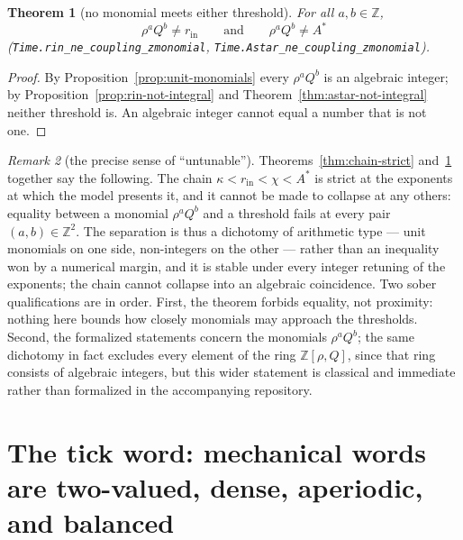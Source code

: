 \documentclass[11pt]{amsart}
\theoremstyle{plain}
\newtheorem{theorem}{Theorem}[section]
\theoremstyle{definition}
\theoremstyle{remark}
\newtheorem{remark}[theorem]{Remark}
\begin{document}
\begin{theorem}[no monomial meets either threshold]\label{thm:no-identity}
For all $a, b \in \mathbb{Z}$,
\[
\rho^a Q^b \neq r_{\mathrm{in}}
\qquad \text{and} \qquad
\rho^a Q^b \neq A^{*}
\]
\textup{(\texttt{Time.rin\_ne\_coupling\_zmonomial}, \texttt{Time.Astar\_ne\_coupling\_zmonomial})}.
\end{theorem}

\begin{proof}
By Proposition~\ref{prop:unit-monomials} every $\rho^a Q^b$ is an algebraic integer; by Proposition~\ref{prop:rin-not-integral} and Theorem~\ref{thm:astar-not-integral} neither threshold is. An algebraic integer cannot equal a number that is not one.
\end{proof}

\begin{remark}[the precise sense of ``untunable'']\label{rem:untunable}
Theorems~\ref{thm:chain-strict} and~\ref{thm:no-identity} together say the following. The chain $\kappa < r_{\mathrm{in}} < \chi < A^{*}$ is strict at the exponents at which the model presents it, and it cannot be made to collapse at any others: equality between a monomial $\rho^a Q^b$ and a threshold fails at every pair $(a,b) \in \mathbb{Z}^2$. The separation is thus a dichotomy of arithmetic type --- unit monomials on one side, non-integers on the other --- rather than an inequality won by a numerical margin, and it is stable under every integer retuning of the exponents; the chain cannot collapse into an algebraic coincidence. Two sober qualifications are in order. First, the theorem forbids equality, not proximity: nothing here bounds how closely monomials may approach the thresholds. Second, the formalized statements concern the monomials $\rho^a Q^b$; the same dichotomy in fact excludes every element of the ring $\mathbb{Z}[\rho, Q]$, since that ring consists of algebraic integers, but this wider statement is classical and immediate rather than formalized in the accompanying repository.
\end{remark}

\section{The tick word: mechanical words are two-valued, dense, aperiodic, and balanced}
\label{sec:word}
\end{document}
